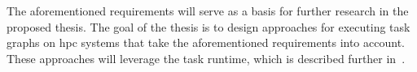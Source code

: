 The aforementioned requirements will serve as a basis for further research in the proposed thesis.
The goal of the thesis is to design approaches for executing task graphs on
\gls{hpc} systems that take the aforementioned requirements into account. These
approaches will leverage the \hyperqueue{} task runtime, which is described further
in~.
